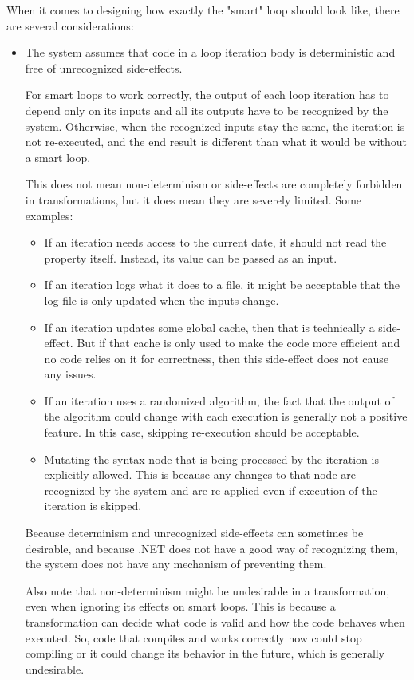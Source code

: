 When it comes to designing how exactly the "smart"  loop should look like, there are several considerations:

\begin{itemize}
\item The system assumes that code in a loop iteration body is deterministic and free of unrecognized side-effects.

For smart loops to work correctly, the output of each loop iteration has to depend only on its inputs and all its outputs have to be recognized by the system. Otherwise, when the recognized inputs stay the same, the iteration is not re-executed, and the end result is different than what it would be without a smart loop.

This does not mean non-determinism or side-effects are completely forbidden in transformations, but it does mean they are severely limited. Some examples:

\begin{itemize}
\item If an iteration needs access to the current date, it should not read the  property itself. Instead, its value can be passed as an input.
\item If an iteration logs what it does to a file, it might be acceptable that the log file is only updated when the inputs change.
\item If an iteration updates some global cache, then that is technically a side-effect. But if that cache is only used to make the code more efficient and no code relies on it for correctness, then this side-effect does not cause any issues.
\item If an iteration uses a randomized algorithm, the fact that the output of the algorithm could change with each execution is generally not a positive feature. In this case, skipping re-execution should be acceptable.
\item Mutating the syntax node that is being processed by the iteration is explicitly allowed. This is because any changes to that node are recognized by the system and are re-applied even if execution of the iteration is skipped.
\end{itemize}

Because determinism and unrecognized side-effects can sometimes be desirable, and because .NET does not have a good way of recognizing them, the system does not have any mechanism of preventing them.

Also note that non-determinism might be undesirable in a transformation, even when ignoring its effects on smart loops. This is because a transformation can decide what code is valid and how the code behaves when executed. So, code that compiles and works correctly now could stop compiling or it could change its behavior in the future, which is generally undesirable.


\end{itemize}

